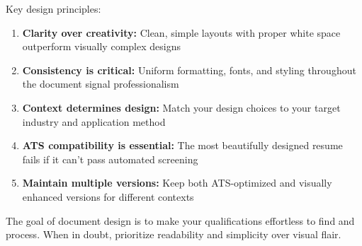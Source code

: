 \documentclass[11pt,a4paper]{article}
\begin{document}
Key design principles:
\begin{enumerate}
    \item \textbf{Clarity over creativity:} Clean, simple layouts with proper white space outperform visually complex designs
    \item \textbf{Consistency is critical:} Uniform formatting, fonts, and styling throughout the document signal professionalism
    \item \textbf{Context determines design:} Match your design choices to your target industry and application method
    \item \textbf{ATS compatibility is essential:} The most beautifully designed resume fails if it can't pass automated screening
    \item \textbf{Maintain multiple versions:} Keep both ATS-optimized and visually enhanced versions for different contexts
\end{enumerate}

The goal of document design is to make your qualifications effortless to find and process. When in doubt, prioritize readability and simplicity over visual flair.
\end{document}
